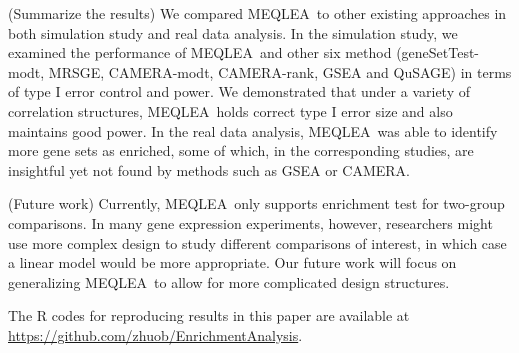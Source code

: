 \documentclass[useAMS,usenatbib, galley]{biom}
\newcommand{\OurMethod}{MEQLEA}
\newcommand{\CMR}{CAMERA-rank}
\newcommand{\CMT}{CAMERA-modt}
\newcommand{\gent}{geneSetTest-modt}
\begin{document}
	(Summarize the results) We compared \OurMethod~to other existing approaches in both simulation study and real data analysis. In the simulation study, we examined the performance of \OurMethod~and other six method (\gent, MRSGE, \CMT, \CMR, GSEA and QuSAGE) in terms of type I error control and power. We demonstrated that under a variety of correlation structures, \OurMethod~holds correct type I error size and also maintains good power. In the real data analysis, \OurMethod~was able to identify more gene sets as enriched, some of which, in the corresponding studies, are insightful yet not found by methods such as GSEA or CAMERA.  
	
	(Future work) Currently, \OurMethod~only supports enrichment test for two-group comparisons. In many gene expression experiments, however, researchers might use more complex design to study different comparisons of interest, in which case a linear model would be more appropriate. Our future work will focus on generalizing \OurMethod~to allow for more complicated design structures. 
	
	The R codes for reproducing results in this paper are available at \url{https://github.com/zhuob/EnrichmentAnalysis}.
	
\end{document}
